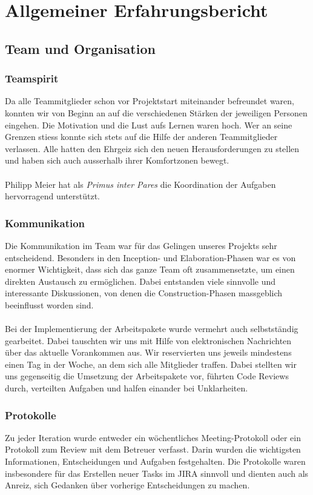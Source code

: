 \chapter{Allgemeiner Erfahrungsbericht}
	\section{Team und Organisation}
	
		\subsection{Teamspirit}
		Da alle Teammitglieder schon vor Projektstart miteinander befreundet waren, konnten wir  von Beginn an auf die verschiedenen Stärken der jeweiligen Personen eingehen. Die Motivation und die Lust aufs Lernen waren hoch. Wer an seine Grenzen stiess konnte sich stets auf die Hilfe der anderen Teammitglieder verlassen. Alle hatten den Ehrgeiz sich den neuen Herausforderungen zu stellen und haben sich auch ausserhalb ihrer Komfortzonen bewegt.\\ \\
		Philipp Meier hat als \textit{Primus inter Pares} die Koordination der Aufgaben hervorragend unterstützt. 
		
		\subsection{Kommunikation}
		Die Kommunikation im Team war für das Gelingen unseres Projekts sehr entscheidend. Besonders in den Inception- und Elaboration-Phasen war es von enormer Wichtigkeit, dass sich das ganze Team oft zusammensetzte, um einen direkten Austausch zu ermöglichen. Dabei entstanden viele sinnvolle und interessante Diskussionen, von denen die Construction-Phasen massgeblich beeinflusst worden sind.\\ \\
		Bei der Implementierung der Arbeitspakete wurde vermehrt auch selbstständig gearbeitet. Dabei tauschten wir uns mit Hilfe von elektronischen Nachrichten über das aktuelle Vorankommen aus. Wir reservierten uns jeweils mindestens einen Tag in der Woche, an dem sich alle Mitglieder traffen. Dabei stellten wir uns gegenseitig die Umsetzung der Arbeitspakete vor, führten Code Reviews durch, verteilten Aufgaben und halfen einander bei Unklarheiten.
		
		\subsection{Protokolle}
		Zu jeder Iteration wurde entweder ein wöchentliches Meeting-Protokoll oder ein Protokoll zum Review mit dem Betreuer verfasst. Darin wurden die wichtigsten Informationen, Entscheidungen und Aufgaben festgehalten. Die Protokolle waren insbesondere für das Erstellen neuer Tasks im JIRA sinnvoll und dienten auch als Anreiz, sich Gedanken über vorherige Entscheidungen zu machen. 
		
